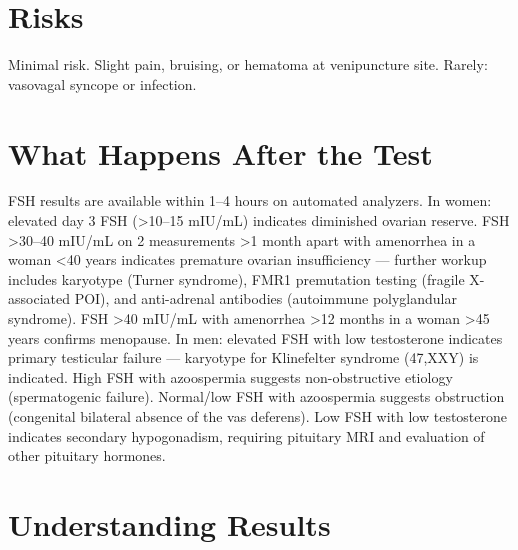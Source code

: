 \section*{Risks}
Minimal risk. Slight pain, bruising, or hematoma at venipuncture site. Rarely: vasovagal syncope or infection.

\section*{What Happens After the Test}
FSH results are available within 1--4 hours on automated analyzers. In women: elevated day 3 FSH (>10--15 mIU/mL) indicates diminished ovarian reserve. FSH >30--40 mIU/mL on 2 measurements >1 month apart with amenorrhea in a woman <40 years indicates premature ovarian insufficiency --- further workup includes karyotype (Turner syndrome), FMR1 premutation testing (fragile X-associated POI), and anti-adrenal antibodies (autoimmune polyglandular syndrome). FSH >40 mIU/mL with amenorrhea >12 months in a woman >45 years confirms menopause. In men: elevated FSH with low testosterone indicates primary testicular failure --- karyotype for Klinefelter syndrome (47,XXY) is indicated. High FSH with azoospermia suggests non-obstructive etiology (spermatogenic failure). Normal/low FSH with azoospermia suggests obstruction (congenital bilateral absence of the vas deferens). Low FSH with low testosterone indicates secondary hypogonadism, requiring pituitary MRI and evaluation of other pituitary hormones.

\section*{Understanding Results}

